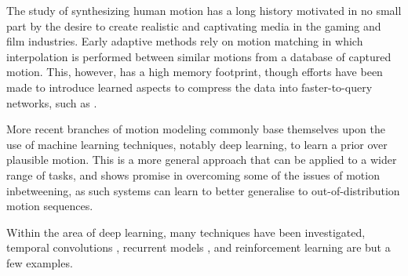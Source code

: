 The study of synthesizing human motion has a long history motivated in no small part by the desire to create realistic and captivating media in the gaming and film industries. Early adaptive methods rely on motion matching \cite{early_motion_matching} \cite{clavet_motion_matching} in which interpolation is performed between similar motions from a database of captured motion. This, however, has a high memory footprint, though efforts have been made to introduce learned aspects to compress the data into faster-to-query networks, such as \cite{holden_motion_matching}.


More recent branches of motion modeling commonly base themselves upon the use of machine learning techniques, notably deep learning, to learn a prior over plausible motion. This is a more general approach that can be applied to a wider range of tasks, and shows promise in overcoming some of the issues of motion inbetweening, as such systems can learn to better generalise to out-of-distribution motion sequences.

Within the area of deep learning, many techniques have been investigated, temporal convolutions \cite{temporal_convolutions}, recurrent models \cite{recurrent_harvey_2020}, and reinforcement learning \cite{rl_cho} are but a few examples.
